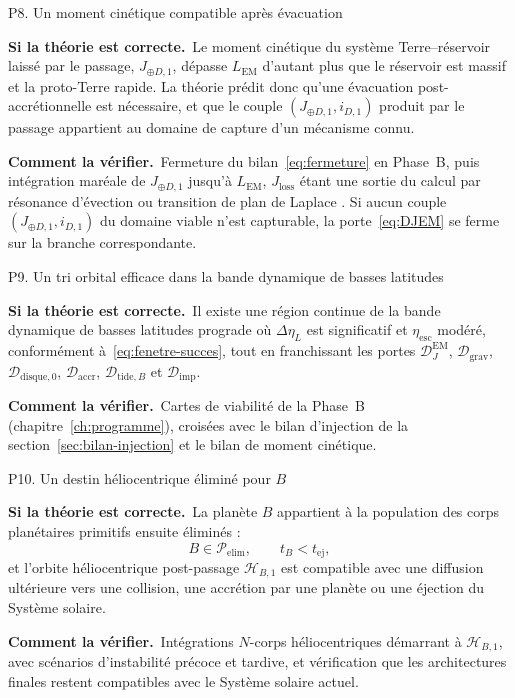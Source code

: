 \documentclass[11pt,a4paper,openany]{report}
\newcommand{\sila}{\par\noindent\textbf{Si la théorie est correcte.}\ }
\newcommand{\verif}{\par\smallskip\noindent\textbf{Comment la vérifier.}\ }
\begin{document}
\begin{prediction}{P8. Un moment cinétique compatible après évacuation}
\sila Le moment cinétique du système Terre--réservoir laissé par le passage, $J_{\oplus D,1}$,
dépasse $L_{\mathrm{EM}}$ d'autant plus que le réservoir est massif et la proto-Terre rapide. La
théorie prédit donc qu'une évacuation post-accrétionnelle est nécessaire, et que le couple
$(J_{\oplus D,1},i_{D,1})$ produit par le passage appartient au domaine de capture d'un mécanisme
connu.
\verif Fermeture du bilan~\eqref{eq:fermeture} en Phase~B, puis intégration maréale de
$J_{\oplus D,1}$ jusqu'à $L_{\mathrm{EM}}$, $J_{\mathrm{loss}}$ étant une sortie du calcul
par résonance d'évection ou transition de plan de Laplace
\cite{MurrayDermott1999,TremaineTouma2009}. Si aucun couple $(J_{\oplus D,1},i_{D,1})$ du domaine
viable n'est capturable, la porte~\eqref{eq:DJEM} se ferme sur la branche correspondante.
\end{prediction}

\begin{prediction}{P9. Un tri orbital efficace dans la bande dynamique de basses latitudes}
\sila Il existe une région continue de la bande dynamique de basses latitudes prograde où $\Delta\eta_L$ est
significatif et $\eta_{\mathrm{esc}}$ modéré, conformément à~\eqref{eq:fenetre-succes}, tout en
franchissant les portes $\mathcal{D}_J^{\mathrm{EM}}$, $\mathcal{D}_{\mathrm{grav}}$,
$\mathcal{D}_{\mathrm{disque},0}$, $\mathcal{D}_{\mathrm{accr}}$,
$\mathcal{D}_{\mathrm{tide},B}$ et $\mathcal{D}_{\mathrm{imp}}$.
\verif Cartes de viabilité de la Phase~B (chapitre~\ref{ch:programme}), croisées avec le bilan
d'injection de la section~\ref{sec:bilan-injection} et le bilan de moment cinétique.
\end{prediction}

\begin{prediction}{P10. Un destin héliocentrique éliminé pour \texorpdfstring{$B$}{B}}
\sila La planète $B$ appartient à la population des corps planétaires primitifs ensuite éliminés :
\begin{equation}
B\in\mathcal{P}_{\mathrm{elim}},\qquad t_B<t_{\mathrm{ej}},
\label{eq:predB}
\end{equation}
et l'orbite héliocentrique post-passage $\mathcal{H}_{B,1}$ est compatible avec une diffusion
ultérieure vers une collision, une accrétion par une planète ou une éjection du Système solaire.
\verif Intégrations $N$-corps héliocentriques démarrant à $\mathcal{H}_{B,1}$, avec scénarios
d'instabilité précoce et tardive, et vérification que les architectures finales restent compatibles
avec le Système solaire actuel.
\end{prediction}
\end{document}
